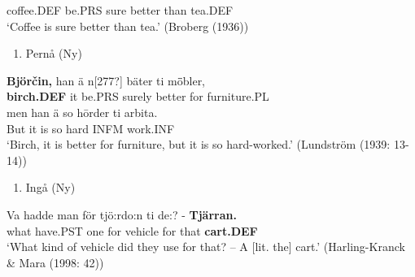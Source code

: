 coffee.DEF  be.PRS  sure  better   than  tea.DEF\\ %


‘Coffee is sure better than tea.’ (Broberg (1936))
\z

\begin{enumerate} %
\item 
Pernå (Ny) 

\end{enumerate} %
\ea\label{}
\gll \textbf{Björčin,} han  ä  n[277?]  bäter  ti  m\={ö}bler,\\


\textbf{birch.DEF} it  be.PRS  surely  better  for  furniture.PL\\ %


\ea\label{}
\gll men  han  ä  so  h\=order  ti  arbita.\\


But  it  is  so  hard  INFM   work.INF\\ %


‘Birch, it is better for furniture, but it is so hard-worked.’ (Lundström (1939: 13-14))
\z

\begin{enumerate} %
\item 
Ingå (Ny)

\end{enumerate} %
\ea\label{}
\gll Va  hadde  man  för  tjö:rdo:n  ti  de:?  {}-  \textbf{Tjärran.}\\


what  have.PST  one  for  vehicle  for  that    \textbf{cart.DEF}\\ %


‘What kind of vehicle did they use for that? – A [lit. the] cart.’ (Harling-Kranck \& Mara (1998: 42))
\z

